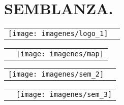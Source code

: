 \documentclass[10pt,letter]{report}
\begin{document}
\chapter*{SEMBLANZA.}
\thispagestyle{fancy}
\begin{table}[H]
\begin{tabular}{m{7cm}m{11cm}}
\texttt{[image: imagenes/logo\_1]}&
\begin{minipage}{10cm}


\end{minipage}
\end{tabular}
\end{table}


\begin{table}[H]
\begin{tabular}{m{11cm}m{6cm}}

\begin{minipage}{10cm}


\end{minipage}
&

\texttt{[image: imagenes/map]}\\
\end{tabular}
\end{table}

\begin{table}[H]
\begin{tabular}{m{6cm}m{11cm}}
\texttt{[image: imagenes/sem\_2]}&
\begin{minipage}{10cm}



\end{minipage}
\end{tabular}
\end{table}



\begin{table}[H]
\begin{tabular}{m{11cm}m{6cm}}

\begin{minipage}{10cm}


\end{minipage}&

\texttt{[image: imagenes/sem\_3]}\\
\end{tabular}
\end{table}
\end{document}
